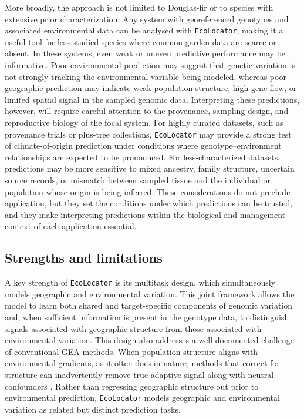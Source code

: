 \documentclass[]{article}
\newcommand{\dfir}{Douglas-fir\xspace}
\newcommand{\ecolocator}{\texttt{EcoLocator}\xspace}
\begin{document}
More broadly,
the approach is not limited to \dfir
or to species with extensive prior characterization.
Any system with georeferenced genotypes and associated environmental data
can be analysed with \ecolocator,
making it a useful tool for less-studied species
where common-garden data are scarce or absent.
In these systems,
even weak or uneven predictive performance may be informative.
Poor environmental prediction may suggest that genetic variation
is not strongly tracking the environmental variable being modeled,
whereas poor geographic prediction may indicate weak population structure,
high gene flow,
or limited spatial signal in the sampled genomic data.
Interpreting these predictions,
however,
will require careful attention
to the provenance,
sampling design,
and reproductive biology of the focal system.
For highly curated datasets,
such as provenance trials or plus-tree collections,
\ecolocator may provide a strong test of climate-of-origin prediction
under conditions where genotype--environment relationships are expected
to be pronounced.
For less-characterized datasets,
predictions may be more sensitive to mixed ancestry,
family structure,
uncertain source records,
or mismatch between sampled tissue and the individual or population
whose origin is being inferred.
These considerations do not preclude application,
but they set the conditions under which predictions can be trusted,
and they make interpreting predictions within the biological
and management context of each application essential.
 
\subsection{Strengths and limitations}

A key strength of \ecolocator is its multitask design, 
which simultaneously models geographic and environmental variation. 
This joint framework allows the model to learn both shared and target-specific 
components of genomic variation and, when sufficient information is present in the 
genotype data, to distinguish signals associated with geographic structure from those 
associated with environmental variation. This design also addresses a well-documented 
challenge of conventional GEA methods. When population structure aligns with 
environmental gradients, as it often does in nature, methods that correct for 
structure can inadvertently remove true adaptive signal along with neutral 
confounders \citep{lotterhos_recombination_2019, booker_wza_2024}. 
Rather than regressing geographic structure out prior to environmental prediction, 
\ecolocator models geographic and environmental variation as related but distinct
prediction tasks.
\end{document}
